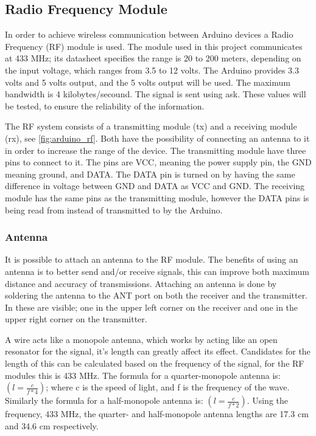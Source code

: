\subsection{Radio Frequency Module} \label{rfmodule}
In order to achieve wireless communication between Arduino devices a Radio Frequency (RF) module is used.
The module used in this project communicates at 433 MHz; its datasheet specifies the range is 20 to 200 meters, depending on the input voltage, which ranges from 3.5 to 12 volts. 
The Arduino provides 3.3 volts and 5 volts output, and the 5 volts output will be used.
The maximum bandwidth is 4 kilobytes/secound. 
The signal is sent using \gls{ask}.
These values will be tested, to ensure the reliability of the information. 

The RF system consists of a transmitting module (tx) and a receiving module (rx), see \ref{fig:arduino_rf}.
Both have the possibility of connecting an antenna to it in order to increase the range of the device.
The transmitting module have three pins to connect to it.
The pins are VCC, meaning the power supply pin, the GND meaning ground, and DATA.
The DATA pin is turned on by having the same difference in voltage between GND and DATA as VCC and GND. 
The receiving module has the same pins as the transmitting module, however the DATA pins is being read from instead of transmitted to by the Arduino.


\subsubsection{Antenna}
It is possible to attach an antenna to the RF module. 
The benefits of using an antenna is to better send and/or receive signals, this can improve both maximum distance and accuracy of transmissions.
Attaching an antenna is done by soldering the antenna to the ANT port on both the receiver and the transmitter. 
In  these are visible; one in the upper left corner on the receiver and one in the upper right corner on the transmitter. 

A wire acts like a monopole antenna, which works by acting like an open resonator for the signal, it's length can greatly affect its effect. 
Candidates for the length of this can be calculated based on the frequency of the signal, for the RF modules this is 433 MHz.
The formula for a quarter-monopole antenna is: $(l = \frac{c}{f * 4})$; where c is the speed of light, and f is the frequency of the wave.
Similarly the formula for a half-monopole antenna is: $(l = \frac{c}{f * 2})$.
Using the frequency, 433 MHz, the quarter- and half-monopole antenna lengths are 17.3 cm and 34.6 cm respectively.

